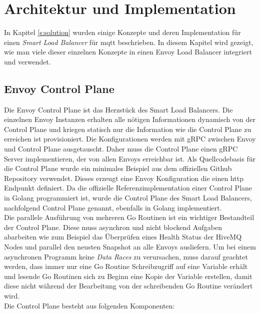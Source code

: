 \section{Architektur und Implementation}
In Kapitel \ref{s:solution} wurden einige Konzepte und deren Implementation für einen \textit{Smart Load Balancer} für \ac{mqtt} beschrieben. In diesem Kapitel wird gezeigt, wie man viele dieser einzelnen Konzepte in einen Envoy Load Balancer integriert und verwendet.

\subsection{Envoy Control Plane}
Die Envoy Control Plane ist das Herzstück des Smart Load Balancers. Die einzelnen Envoy Instanzen erhalten alle nötigen Informationen dynamisch von der Control Plane und kriegen statisch nur die Information wie die Control Plane zu erreichen ist provisioniert.
Die Konfigurationen werden mit gRPC zwischen Envoy und Control Plane ausgetauscht. Daher muss die Control Plane einen gRPC Server implementieren, der von allen Envoys erreichbar ist.
Als Quellcodebasis für die Control Plane wurde ein minimales Beispiel aus dem offiziellen Github Repository \cite{EnvoyproxyGocontrolplane} verwendet. Dieses erzeugt eine Envoy Konfiguration die einen \ac{http} Endpunkt definiert. Da die offizielle Referenzimplementation einer Control Plane in Golang programmiert ist, wurde die Control Plane des Smart Load Balancers, nachfolgend Control Plane genannt, ebenfalls in Golang implementiert.
\\
Die parallele Ausführung von mehreren Go Routinen ist ein wichtiger Bestandteil der Control Plane. Diese muss asynchron und nicht blockend Aufgaben abarbeiten wie zum Beispiel das Überprüfen eines Health Status der HiveMQ Nodes und parallel den neusten Snapshot an alle Envoys ausliefern.
Um bei einem asynchronen Programm keine \textit{Data Races} zu verursachen, muss darauf geachtet werden, dass immer nur eine Go Routine Schreibzugriff auf eine Variable erhält und lesende Go Routinen sich zu Beginn eine Kopie der Variable erstellen, damit diese nicht während der Bearbeitung von der schreibenden Go Routine verändert wird.
\\
Die Control Plane besteht aus folgenden Komponenten:%
